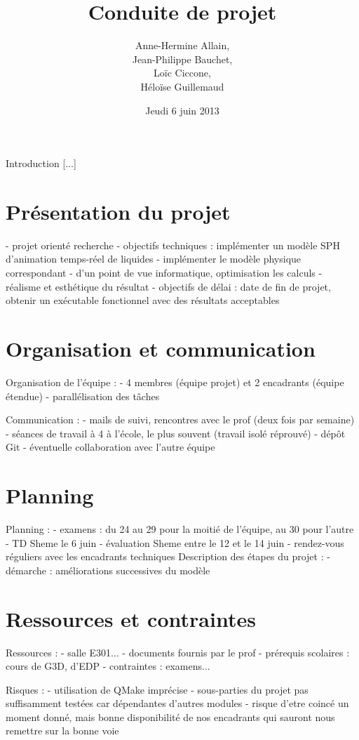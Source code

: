 \documentclass[a4paper,10pt]{article}
\title{Conduite de projet}
\author{Anne-Hermine Allain, \\ 
Jean-Philippe Bauchet, \\ 
Loïc Ciccone, \\ 
Héloïse Guillemaud}
\date{Jeudi 6 juin 2013}
\begin{document}
\maketitle

Introduction [...]


\section{Présentation du projet}

- projet orienté recherche
- objectifs techniques : implémenter un modèle SPH d'animation temps-réel de liquides
	- implémenter le modèle physique correspondant
	- d'un point de vue informatique, optimisation les calculs
	- réalisme et esthétique du résultat
- objectifs de délai : date de fin de projet, obtenir un exécutable fonctionnel avec des résultats acceptables


\section{Organisation et communication}

Organisation de l'équipe :
- 4 membres (équipe projet) et 2 encadrants (équipe étendue)
- parallélisation des tâches

Communication :
- mails de suivi, rencontres avec le prof (deux fois par semaine)
- séances de travail à 4 à l'école, le plus souvent (travail isolé réprouvé)
- dépôt Git
- éventuelle collaboration avec l'autre équipe


\section{Planning}

Planning :
- examens : du 24 au 29 pour la moitié de l'équipe, au 30 pour l'autre
- TD Sheme le 6 juin
- évaluation Sheme entre le 12 et le 14 juin
- rendez-vous réguliers avec les encadrants techniques
Description des étapes du projet :
- démarche : améliorations successives du modèle

\section{Ressources et contraintes}

Ressources :
- salle E301...
- documents fournis par le prof
- prérequis scolaires : cours de G3D, d'EDP
- contraintes : examens...

Risques :
- utilisation de QMake imprécise
- sous-parties du projet pas suffisamment testées car dépendantes d'autres modules
- risque d'etre coincé un moment donné, mais bonne disponibilité de nos encadrants qui sauront nous remettre sur la bonne voie
\end{document}
